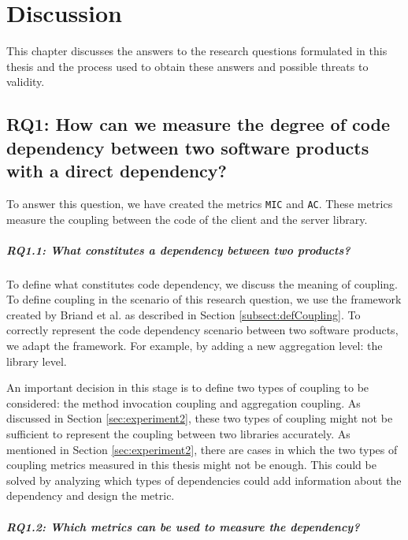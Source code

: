 \chapter{Discussion}\label{ch:Discussion}
This chapter discusses the answers to the research questions formulated in this thesis and the process used to obtain these answers and possible threats to validity.

\section{RQ1: How can we measure the degree of code dependency between two software products with a direct dependency?}

To answer this question, we have created the metrics \texttt{MIC} and \texttt{AC}. These metrics measure the coupling between the code of the client and the server library.

\paragraph{RQ1.1: What constitutes a dependency between two products?}

To define what constitutes code dependency, we discuss the meaning of coupling. To define coupling in the scenario of this research question, we use the framework created by Briand et al. \cite{briand1999unified} as described in Section \ref{subsect:defCoupling}. To correctly represent the code dependency scenario between two software products, we adapt the framework. For example, by adding a new aggregation level: the library level.

An important decision in this stage is to define two types of coupling to be considered: the method invocation coupling and aggregation coupling. As discussed in Section \ref{sec:experiment2}, these two types of coupling might not be sufficient to represent the coupling between two libraries accurately. As mentioned in Section \ref{sec:experiment2}, there are cases in which the two types of coupling metrics measured in this thesis might not be enough. This could be solved by analyzing which types of dependencies could add information about the dependency and design the metric.

\paragraph{RQ1.2: Which metrics can be used to measure the dependency?}

